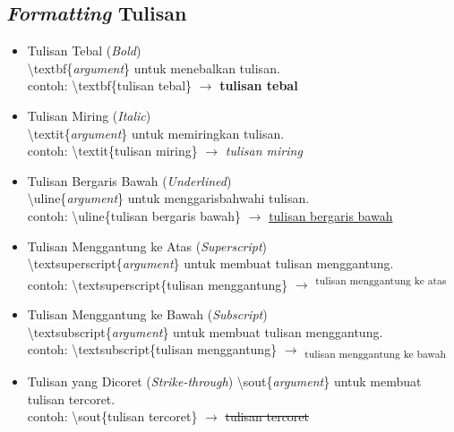 \subsection{\textit{Formatting} Tulisan}
\begin{itemize}
\item Tulisan Tebal (\textit{Bold})\\
\textbackslash textbf\{\textit{argument}\} untuk menebalkan tulisan.\\
contoh:
\textbackslash textbf\{tulisan tebal\} $\rightarrow$ \textbf{tulisan tebal}

\item Tulisan Miring (\textit{Italic})\\
\textbackslash textit\{\textit{argument}\} untuk memiringkan tulisan.\\
contoh:
\textbackslash textit\{tulisan miring\} $\rightarrow$ \textit{tulisan miring}

\item Tulisan Bergaris Bawah (\textit{Underlined})\\
\textbackslash uline\{\textit{argument}\} untuk menggarisbahwahi tulisan.\\
contoh:
\textbackslash uline\{tulisan bergaris bawah\} $\rightarrow$ \uline{tulisan bergaris bawah}

\item Tulisan Menggantung ke Atas (\textit{Superscript})\\
\textbackslash textsuperscript\{\textit{argument}\} untuk membuat tulisan menggantung.\\
contoh:
\textbackslash textsuperscript\{tulisan menggantung\} $\rightarrow$ \textsuperscript{tulisan menggantung ke atas}

\item Tulisan Menggantung ke Bawah (\textit{Subscript})\\
\textbackslash textsubscript\{\textit{argument}\} untuk membuat tulisan menggantung.\\
contoh:
\textbackslash textsubscript\{tulisan menggantung\} $\rightarrow$ \textsubscript{tulisan menggantung ke bawah}

\item Tulisan yang Dicoret (\textit{Strike-through})
\textbackslash sout\{\textit{argument}\} untuk membuat tulisan tercoret.\\
contoh:
\textbackslash sout\{tulisan tercoret\} $\rightarrow$ \sout{tulisan tercoret}
\end{itemize}

